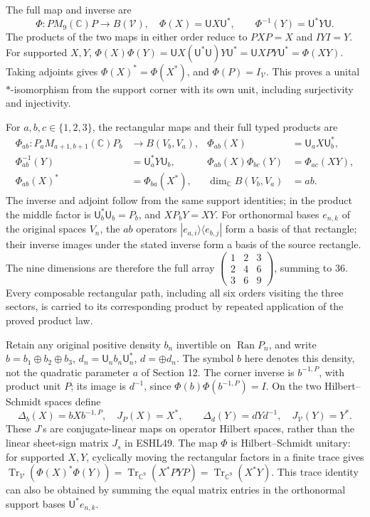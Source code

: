 \documentclass[
  10pt,
  a4paper,
]{article}
\begin{document}
The full map and inverse are \[
\Phi:PM_9(\mathbb C)P\longrightarrow B(\mathcal V),\quad
\Phi(X)=\mathsf UX\mathsf U^*,\qquad
\Phi^{-1}(Y)=\mathsf U^*Y\mathsf U.
\tag{ESHL55}
\] The products of the two maps in either order reduce to \(PXP=X\) and
\(IYI=Y\). For supported \(X,Y\),
\(\Phi(X)\Phi(Y)=\mathsf UX(\mathsf U^*\mathsf U)Y\mathsf U^*=\mathsf UXPY\mathsf U^*=\Phi(XY)\).
Taking adjoints gives \(\Phi(X)^*=\Phi(X^*)\), and
\(\Phi(P)=I_{\mathcal V}\). This proves a unital \(*\)-isomorphism from
the support corner with its own unit, including surjectivity and
injectivity.

For \(a,b,c\in\{1,2,3\}\), the rectangular maps and their full typed
products are \[
\begin{aligned}
\Phi_{ab}:P_aM_{a+1,b+1}(\mathbb C)P_b&\longrightarrow B(V_b,V_a),
&\Phi_{ab}(X)&=\mathsf U_aX\mathsf U_b^*,\\
\Phi_{ab}^{-1}(Y)&=\mathsf U_a^*Y\mathsf U_b,
&\Phi_{ab}(X)\Phi_{bc}(Y)&=\Phi_{ac}(XY),\\
\Phi_{ab}(X)^*&=\Phi_{ba}(X^*),
&\dim_{\mathbb C}B(V_b,V_a)&=ab.
\end{aligned}
\tag{ESHL56}
\] The inverse and adjoint follow from the same support identities; in
the product the middle factor is \(\mathsf U_b^*\mathsf U_b=P_b\), and
\(XP_bY=XY\). For orthonormal bases \(e_{n,k}\) of the original spaces
\(V_n\), the \(ab\) operators \(|e_{a,i}\rangle\langle e_{b,j}|\) form a
basis of that rectangle; their inverse images under the stated inverse
form a basis of the source rectangle. The nine dimensions are therefore
the full array
\(\left(\begin{smallmatrix}1&2&3\\2&4&6\\3&6&9\end{smallmatrix}\right)\),
summing to 36. Every composable rectangular path, including all six
orders visiting the three sectors, is carried to its corresponding
product by repeated application of the proved product law.

Retain any original positive density \(b_n\) invertible on
\(\operatorname{Ran}P_n\), and write \(b=b_1\oplus b_2\oplus b_3\),
\(d_n=\mathsf U_nb_n\mathsf U_n^*\), \(d=\oplus d_n\). The symbol \(b\)
here denotes this density, not the quadratic parameter \(a\) of Section
12. The corner inverse is \(b^{-1,P}\), with product unit \(P\); its
image is \(d^{-1}\), since \(\Phi(b)\Phi(b^{-1,P})=I\). On the two
Hilbert--Schmidt spaces define \[
\Delta_b(X)=bXb^{-1,P},\quad J_P(X)=X^*,\qquad
\Delta_d(Y)=dYd^{-1},\quad J_{\mathcal V}(Y)=Y^*.
\tag{ESHL57}
\] These \(J\)'s are conjugate-linear maps on operator Hilbert spaces,
rather than the linear sheet-sign matrix \(J_s\) in ESHL49. The map
\(\Phi\) is Hilbert--Schmidt unitary: for supported \(X,Y\), cyclically
moving the rectangular factors in a finite trace gives
\(\operatorname{Tr}_{\mathcal V}(\Phi(X)^*\Phi(Y))=\operatorname{Tr}_{\mathbb C^9}(X^*PY P)=\operatorname{Tr}_{\mathbb C^9}(X^*Y)\).
This trace identity can also be obtained by summing the equal matrix
entries in the orthonormal support bases \(\mathsf U^*e_{n,k}\).
\end{document}
